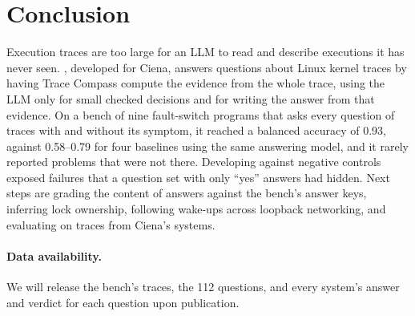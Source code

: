 \section{Conclusion}

Execution traces are too large for an LLM to read and describe executions it has never seen. \sysname, developed for Ciena, answers questions about Linux kernel traces by having Trace Compass compute the evidence from the whole trace, using the LLM only for small checked decisions and for writing the answer from that evidence. On a bench of nine fault-switch programs that asks every question of traces with and without its symptom, it reached a balanced accuracy of 0.93, against 0.58--0.79 for four baselines using the same answering model, and it rarely reported problems that were not there. Developing against negative controls exposed failures that a question set with only ``yes'' answers had hidden. Next steps are grading the content of answers against the bench's answer keys, inferring lock ownership, following wake-ups across loopback networking, and evaluating \sysname on traces from Ciena's systems.

\paragraph{Data availability.} We will release the bench's traces, the 112 questions, and every system's answer and verdict for each question upon publication.
